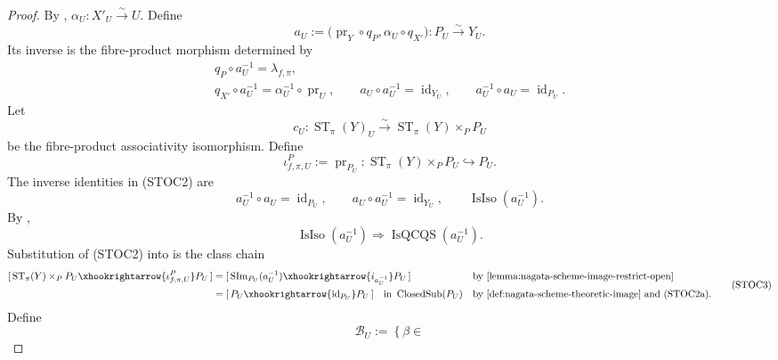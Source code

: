 \begin{proof}
  By ,
  $\alpha_U\colon X'_U\xrightarrow{\sim}U$.  Define
  \[
    a_U:=
      \bigl(\operatorname{pr}_Y\circ q_P,
        \alpha_U\circ q_{X'}\bigr)
      \colon P_U\xrightarrow{\sim}Y_U.                         \tag{STOC1}
  \]
  Its inverse is the fibre-product morphism determined by
  \[
  \begin{gathered}
    q_P\circ a_U^{-1}=\lambda_{f,\pi},\\
    q_{X'}\circ a_U^{-1}
      =\alpha_U^{-1}\circ\operatorname{pr}_U,
    \qquad
    a_U\circ a_U^{-1}=\operatorname{id}_{Y_U},
    \qquad
    a_U^{-1}\circ a_U=\operatorname{id}_{P_U}.
  \end{gathered}                                                    \tag{STOC2}
  \]
  Let
  \[
    c_U\colon
      \operatorname{ST}_\pi(Y)_U
        \xrightarrow{\sim}
      \operatorname{ST}_\pi(Y)\times_PP_U
  \]
  be the fibre-product associativity isomorphism.  Define
  \[
    \iota_{f,\pi,U}^{P}:=\operatorname{pr}_{P_U}\colon
      \operatorname{ST}_\pi(Y)\times_PP_U\hookrightarrow P_U.
  \]
  The inverse identities in (STOC2) are
  \[
    a_U^{-1}\circ a_U=\operatorname{id}_{P_U},\qquad
    a_U\circ a_U^{-1}=\operatorname{id}_{Y_U},\qquad
    \operatorname{IsIso}(a_U^{-1}).                              \tag{STOC2a}
  \]
  By ,
  \[
    \operatorname{IsIso}(a_U^{-1})
      \Longrightarrow\operatorname{IsQCQS}(a_U^{-1}).           \tag{STOC2b}
  \]
  Substitution of (STOC2) into
   is the class chain
  \[
  \begin{aligned}
    [\,\operatorname{ST}_\pi(Y)\times_PP_U
      \xhookrightarrow{\iota_{f,\pi,U}^{P}}P_U\,]
      &=[\,\operatorname{SIm}_{P_U}(a_U^{-1})
        \xhookrightarrow{i_{a_U^{-1}}}P_U\,]
        &&\text{by \Cref{lemma:nagata-scheme-image-restrict-open}}\\
      &=[\,P_U\xhookrightarrow{\operatorname{id}_{P_U}}P_U\,]
        \quad\text{in }\operatorname{ClosedSub}(P_U)
        &&\text{by \Cref{def:nagata-scheme-theoretic-image} and (STOC2a)}.
  \end{aligned}                                                  \tag{STOC3}
  \]
  Define
  \[
    \mathscr B_U:=
      \left\{\beta\in
\]
\end{proof}
